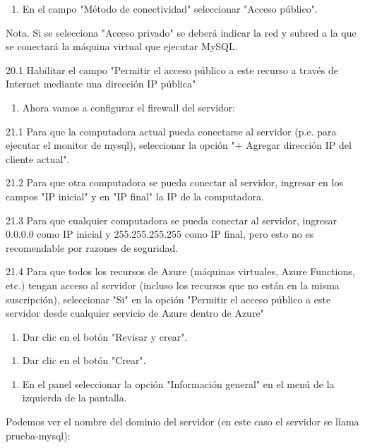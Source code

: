\begin{enumerate}
\item En el campo "Método de conectividad" seleccionar "Acceso público".
\end{enumerate}

Nota. Si se selecciona "Acceso privado" se deberá indicar la red y subred a la que se conectará la máquina virtual que ejecutar MySQL.

20.1 Habilitar el campo "Permitir el acceso público a este recurso a través de Internet mediante una dirección IP pública"

\begin{enumerate}
\item Ahora vamos a configurar el firewall del servidor:
\end{enumerate}

21.1 Para que la computadora actual pueda conectarse al servidor (p.e. para ejecutar el monitor de mysql), seleccionar la opción "+ Agregar dirección IP del cliente actual".

21.2 Para que otra computadora se pueda conectar al servidor, ingresar en los campos "IP inicial" y en "IP final" la IP de la computadora.

21.3 Para que cualquier computadora se pueda conectar al servidor, ingresar 0.0.0.0 como IP inicial y 255.255.255.255 como IP final, pero esto no es recomendable por razones de seguridad.

21.4 Para que todos los recursos de Azure (máquinas virtuales, Azure Functions, etc.) tengan acceso al servidor (incluso los recursos que no están en la misma suscripción), seleccionar "Si" en la opción "Permitir el acceso público a este servidor desde cualquier servicio de Azure dentro de Azure"

\begin{enumerate}
\item Dar clic en el botón "Revisar y crear".
\end{enumerate}

\begin{enumerate}
\item Dar clic en el botón "Crear".
\end{enumerate}

\begin{enumerate}
\item En el panel seleccionar la opción "Información general" en el menú de la izquierda de la pantalla.
\end{enumerate}

Podemos ver el nombre del dominio del servidor (en este caso el servidor se llama prueba-mysql):

